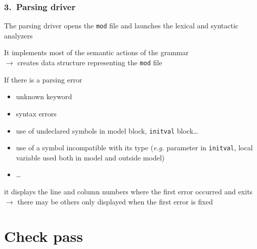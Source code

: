 \documentclass[handout,usepdftitle=false,xcolor=dvipsnames,aspectratio=169]{beamer}
\begin{document}
\begin{frame}
\frametitle{3.\ Parsing driver}

\begin{witemize}
\item The parsing driver opens the \texttt{mod} file and launches the lexical and syntactic analyzers
\item It implements most of the semantic actions of the grammar\\
$\rightarrow$ creates data structure representing the \texttt{mod} file
\item If there is a parsing error
\begin{itemize}
    \item unknown keyword
    \item syntax errors
    \item use of undeclared symbols in model block, \texttt{initval} block\ldots
    \item use of a symbol incompatible with its type (\textit{e.g.} parameter in \texttt{initval}, local variable used both in model and outside model)
    \item \ldots
\end{itemize}
it displays the line and column numbers where the first error occurred and exits\\
$\rightarrow$ there may be others only displayed when the first error is fixed
\end{witemize}
\end{frame}

\section{Check pass}
\end{document}
